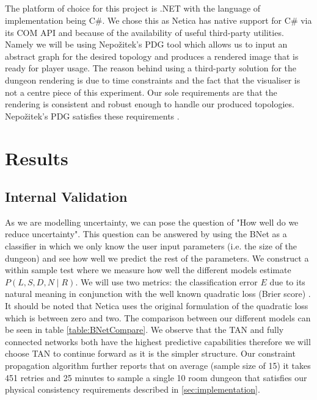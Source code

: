 \documentclass{UoYCSproject}
\begin{document}
\paragraph{}
The platform of choice for this project is .NET with the language of implementation being C\#. We chose this as Netica has native support for C\# via its COM API and because of the availability of useful third-party utilities. Namely we will be using Nepo\v{z}itek's PDG tool \parencite{levelGenerator} which allows us to input an abstract graph for the desired topology and produces a rendered image that is ready for player usage. The reason behind using a third-party solution for the dungeon rendering is due to time constraints and the fact that the visualiser is not a centre piece of this experiment. Our sole requirements are that the rendering is consistent and robust enough to handle our produced topologies. Nepo\v{z}itek's PDG satisfies these requirements \parencite{Nepozitek2018FASTCT}.

\chapter{Results}
\label{cha:results}
\section{Internal Validation}
As we are modelling uncertainty, we can pose the question of "How well do we reduce uncertainty". This question can be answered by using the BNet as a classifier in which we only know the user input parameters (i.e. the size of the dungeon) and see how well we predict the rest of the parameters. We construct a within sample test where we measure how well the different models estimate \(P(L,S,D,N\mid R)\). We will use two metrics: the classification error \(E\) due to its natural meaning in conjunction with the well known quadratic loss (Brier score) \parencite{PearlScoringRules}. It should be noted that Netica uses the original formulation of the quadratic loss which is between zero and two. The comparison between our different models can be seen in table \ref{table:BNetCompare}. We observe that the TAN and fully connected networks both have the highest predictive capabilities therefore we will choose TAN to continue forward as it is the simpler structure. Our constraint propagation algorithm further reports that on average (sample size of 15) it takes 451 retries and 25 minutes to sample a single 10 room dungeon that satisfies our physical consistency requirements described in \ref{sec:implementation}.
\end{document}
